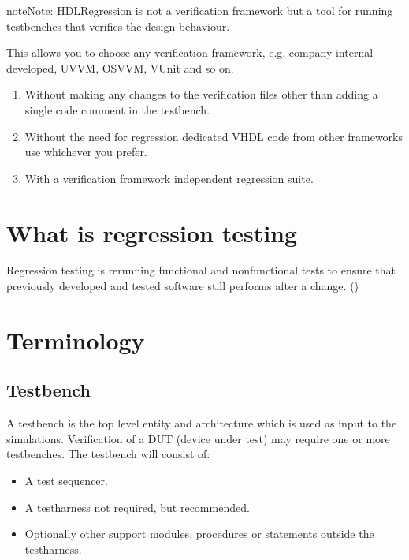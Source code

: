 \documentclass[letterpaper,10pt,english]{sphinxmanual}
\begin{document}
\begin{sphinxadmonition}{note}{Note:}
\sphinxAtStartPar
HDLRegression is not a verification framework but a tool for running testbenches that verifies the design behaviour.

\sphinxAtStartPar
This allows you to choose any verification framework, e.g. company internal developed, UVVM, OSVVM, VUnit and so on.
\begin{enumerate}
%
\item {} 
\sphinxAtStartPar
Without making any changes to the verification files other than adding a single code comment in the testbench.

\item {} 
\sphinxAtStartPar
Without the need for regression dedicated VHDL code from other frameworks \sphinxhyphen{} use whichever you prefer.

\item {} 
\sphinxAtStartPar
With a verification framework independent regression suite.

\end{enumerate}
\end{sphinxadmonition}


\section{What is regression testing}
\label{\detokenize{intro:what-is-regression-testing}}\label{\detokenize{intro:regression-testing}}
\sphinxAtStartPar
Regression testing is re\sphinxhyphen{}running functional and non\sphinxhyphen{}functional tests to ensure that previously developed and
tested software still performs after a change. ()


\section{Terminology}
\label{\detokenize{intro:terminology}}

\subsection{Testbench}
\label{\detokenize{intro:testbench}}
\sphinxAtStartPar
A testbench is the top level entity and architecture which is used as input to the simulations.
Verification of a DUT (device under test) may require one or more testbenches. The testbench will
consist of:
\begin{itemize}
\item {} 
\sphinxAtStartPar
A test sequencer.

\item {} 
\sphinxAtStartPar
A test\sphinxhyphen{}harness \sphinxhyphen{} not required, but recommended.

\item {} 
\sphinxAtStartPar
Optionally other support modules, procedures or statements outside the test\sphinxhyphen{}harness.

\end{itemize}
\end{document}
